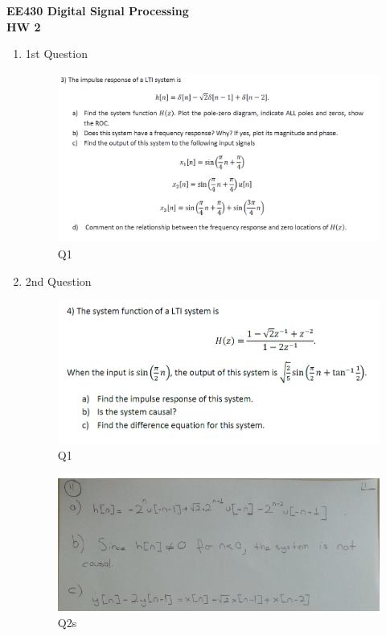 \documentclass[a4paper,12pt]{article}
\begin{document}
\begin{center}
	\textbf{\large EE430 Digital Signal Processing \\[0.2cm] HW 2} \\
\end{center}

\begin{enumerate}
	\item 1st Question
		\begin{figure}[H]
			\center
			\setlength{\unitlength}{\textwidth} 
			\includegraphics[width=1.0\unitlength]{../images/Q3}
			\caption{\label{fig:Q1}Q1 }
		\end{figure}
		
		 
			
			
	\item 2nd Question
		\begin{figure}[H]
			\center
			\setlength{\unitlength}{\textwidth} 
			\includegraphics[width=1.0\unitlength]{../images/Q4}
			\caption{\label{fig:Q1}Q1 }
		\end{figure}
		
		\begin{figure}[H]
			\center
			\setlength{\unitlength}{\textwidth} 
			\includegraphics[width=1.0\unitlength]{../images/Q4s}
			\caption{\label{fig:Q2s}Q2s }
		\end{figure}
		

\end{enumerate}
\end{document}
